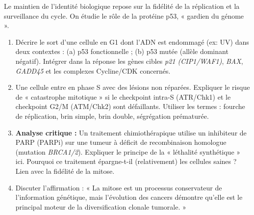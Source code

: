 \documentclass[11pt]{article}
\begin{document}
\begin{exercice}
Le maintien de l'identité biologique repose sur la fidélité de la réplication et la surveillance du cycle. On étudie le rôle de la protéine p53, « gardien du génome ».
\begin{enumerate}
    \item Décrire le sort d'une cellule en G1 dont l'ADN est endommagé (ex: UV) dans deux contextes : (a) p53 fonctionnelle ; (b) p53 mutée (allèle dominant négatif). Intégrer dans la réponse les gènes cibles \textit{p21 (CIP1/WAF1)}, \textit{BAX}, \textit{GADD45} et les complexes Cycline/CDK concernés.
    \item Une cellule entre en phase S avec des lésions non réparées. Expliquer le risque de « catastrophe mitotique » si le checkpoint intra-S (ATR/Chk1) et le checkpoint G2/M (ATM/Chk2) sont défaillants. Utiliser les termes : fourche de réplication, brin simple, brin double, ségrégation prématurée.
    \item \textbf{Analyse critique :} Un traitement chimiothérapique utilise un inhibiteur de PARP (PARPi) sur une tumeur à déficit de recombinaison homologue (mutation \textit{BRCA1/2}). Expliquer le principe de la « léthalité synthétique » ici. Pourquoi ce traitement épargne-t-il (relativement) les cellules saines ? Lien avec la fidélité de la mitose.
    \item Discuter l'affirmation : « La mitose est un processus conservateur de l'information génétique, mais l'évolution des cancers démontre qu'elle est le principal moteur de la diversification clonale tumorale. »
\end{enumerate}
\end{exercice}
\end{document}
